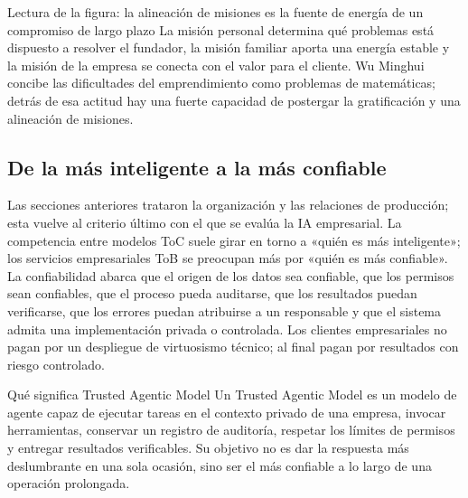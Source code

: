 \documentclass[a4paper]{article}
\begin{document}
\begin{knowledgebox}{Lectura de la figura: la alineación de misiones es la fuente de energía de un compromiso de largo plazo}
La misión personal determina qué problemas está dispuesto a resolver el fundador, la misión familiar aporta una energía estable y la misión de la empresa se conecta con el valor para el cliente. Wu Minghui concibe las dificultades del emprendimiento como problemas de matemáticas; detrás de esa actitud hay una fuerte capacidad de postergar la gratificación y una alineación de misiones.
\end{knowledgebox}

\subsection{De la más inteligente a la más confiable}

Las secciones anteriores trataron la organización y las relaciones de producción; esta vuelve al criterio último con el que se evalúa la IA empresarial. La competencia entre modelos ToC suele girar en torno a «quién es más inteligente»; los servicios empresariales ToB se preocupan más por «quién es más confiable». La confiabilidad abarca que el origen de los datos sea confiable, que los permisos sean confiables, que el proceso pueda auditarse, que los resultados puedan verificarse, que los errores puedan atribuirse a un responsable y que el sistema admita una implementación privada o controlada. Los clientes empresariales no pagan por un despliegue de virtuosismo técnico; al final pagan por resultados con riesgo controlado.

\begin{importantbox}{Qué significa Trusted Agentic Model}
Un Trusted Agentic Model es un modelo de agente capaz de ejecutar tareas en el contexto privado de una empresa, invocar herramientas, conservar un registro de auditoría, respetar los límites de permisos y entregar resultados verificables. Su objetivo no es dar la respuesta más deslumbrante en una sola ocasión, sino ser el más confiable a lo largo de una operación prolongada.
\end{importantbox}
\end{document}
